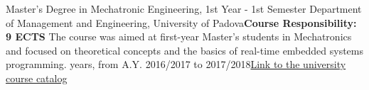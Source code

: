 {
    {Master's Degree in Mechatronic Engineering, 1st Year - 1st Semester}
    {\newline  Department of Management and Engineering, University of Padova\newline \textbf{Course Responsibility: 9 ECTS}\newline
        The course was aimed at first-year Master's students in Mechatronics and focused on theoretical concepts and the basics of real-time embedded systems programming.}{ years, from A.Y. 2016/2017 to 2017/2018}{\href{https://didattica.unipd.it/off/2017/LM/IN/IN0529/000ZZ/IN01122661/N0}{Link to the university course catalog}}








}

